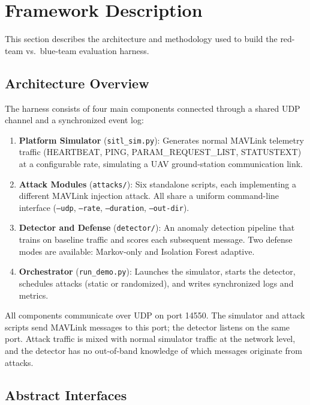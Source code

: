 \section{Framework Description} \label{sec:framework}

This section describes the architecture and methodology used to build the
red-team vs.\ blue-team evaluation harness.

\subsection{Architecture Overview}

The harness consists of four main components connected through a shared
UDP channel and a synchronized event log:

\begin{enumerate}
    \item \textbf{Platform Simulator} (\texttt{sitl\_sim.py}): Generates
          normal MAVLink telemetry traffic (HEARTBEAT, PING,
          PARAM\_REQUEST\_LIST, STATUSTEXT) at a configurable rate,
          simulating a UAV ground-station communication link.
    \item \textbf{Attack Modules} (\texttt{attacks/}): Six standalone
          scripts, each implementing a different MAVLink injection attack.
          All share a uniform command-line interface (\texttt{--udp},
          \texttt{--rate}, \texttt{--duration}, \texttt{--out-dir}).
    \item \textbf{Detector and Defense} (\texttt{detector/}): An anomaly
          detection pipeline that trains on baseline traffic and scores
          each subsequent message.  Two defense modes are available:
          Markov-only and Isolation Forest adaptive.
    \item \textbf{Orchestrator} (\texttt{run\_demo.py}): Launches the
          simulator, starts the detector, schedules attacks (static or
          randomized), and writes synchronized logs and metrics.
\end{enumerate}

All components communicate over UDP on port 14550.  The simulator and
attack scripts send MAVLink messages to this port; the detector listens
on the same port.  Attack traffic is mixed with normal simulator traffic
at the network level, and the detector has no out-of-band knowledge of
which messages originate from attacks.

\subsection{Abstract Interfaces}

